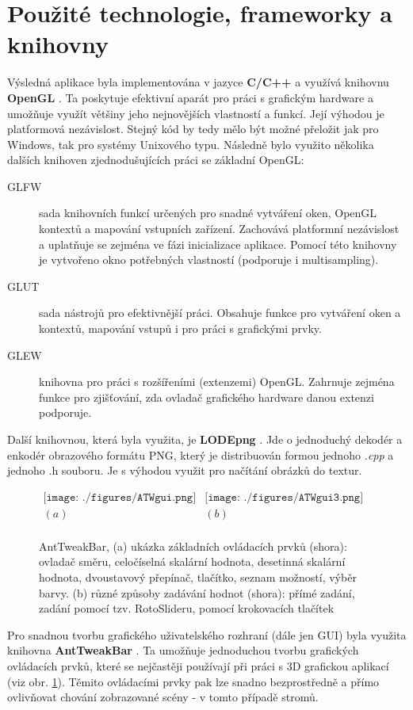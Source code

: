 \section{Použité technologie, frameworky a knihovny}
\label{sec-frameworks}

Výsledná aplikace byla implementována v jazyce {\bf C/C++} a využívá knihovnu {\bf OpenGL} \cite{openGL}. Ta poskytuje efektivní aparát pro práci s grafickým hardware a umožňuje využít většiny jeho nejnovějších vlastností a funkcí. Její výhodou je platformová nezávislost. Stejný kód by tedy mělo být možné přeložit jak pro Windows, tak pro systémy Unixového typu. Následně bylo využito několika dalších knihoven zjednodušujících práci se základní OpenGL:
\begin{description}
\item[GLFW] \cite{GLFW} sada knihovních funkcí určených pro snadné vytváření oken, OpenGL kontextů a mapování vstupních zařízení. Zachovává platformní nezávislost a uplatňuje se zejména ve fázi inicializace aplikace. Pomocí této knihovny je vytvořeno okno potřebných vlastností (podporuje i multisampling).
\item[GLUT] \cite{GLUT} sada nástrojů pro efektivnější práci. Obsahuje funkce pro vytváření oken a kontextů, mapování vstupů i pro práci s grafickými prvky.
\item[GLEW] \cite{GLEW} knihovna pro práci s rozšířeními (extenzemi) OpenGL. Zahrnuje zejména funkce pro zjišťování, zda ovladač grafického hardware danou extenzi podporuje.
\end{description}
Další knihovnou, která byla využita, je {\bf LODEpng} \cite{LODEpng}. Jde o jednoduchý dekodér a enkodér obrazového formátu PNG, který je distribuován formou jednoho \emph{.cpp} a jednoho {.h} souboru. Je s výhodou využit pro načítání obrázků do textur.

\begin{figure}[!hbt]
\begin{center}
$\begin{array}{cc}
\texttt{[image: ./figures/ATWgui.png]}&
\texttt{[image: ./figures/ATWgui3.png]}\\
(a)&(b)\\
\end{array}$
\caption[AntTweakBar, jednoduché GUI]%
{AntTweakBar, (a) ukázka základních ovládacích prvků (shora): ovladač směru, celočíselná skalární hodnota, desetinná skalární hodnota, dvoustavový přepínač, tlačítko, seznam možností, výběr barvy.  (b) různé způsoby zadávání hodnot (shora): přímé zadání, zadání pomocí tzv. RotoSlideru, pomocí krokovacích tlačítek \label{fig:ATWgui}
}
\end{center}
\end{figure}
Pro snadnou tvorbu grafického uživatelského rozhraní (dále jen GUI) byla využita knihovna {\bf AntTweakBar} \cite{AntTweakBar}. Ta umožňuje jednoduchou tvorbu grafických ovládacích prvků, které se nejčastěji používají při práci s 3D grafickou aplikací (viz obr. \ref{fig:ATWgui}). Těmito ovládacími prvky pak lze snadno bezprostředně a přímo ovlivňovat chování zobrazované scény - v tomto případě stromů.





